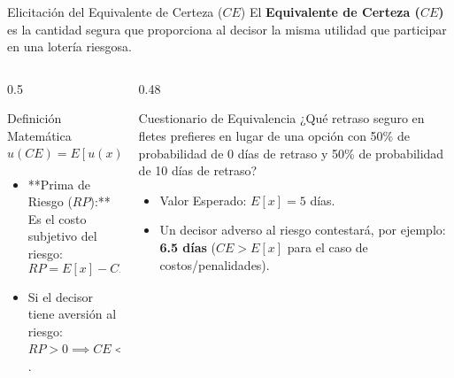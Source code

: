 \documentclass[aspectratio=169, 10pt]{beamer}
\begin{document}
\begin{frame}{Elicitación del Equivalente de Certeza ($CE$)}
    El \textbf{Equivalente de Certeza ($CE$)} es la cantidad segura que proporciona al decisor la misma utilidad que participar en una lotería riesgosa.
    \begin{columns}
        \begin{column}{0.5\textwidth}
            \begin{block}{Definición Matemática}
                \begin{equation*}
                    u(CE) = E[u(x)] = p \cdot u(x_{\text{mejor}}) + (1-p) \cdot u(x_{\text{peor}})
                \end{equation*}
                \begin{itemize}
                    \item **Prima de Riesgo ($RP$):** Es el costo subjetivo del riesgo:
                    \begin{equation*}
                        RP = E[x] - CE
                    \end{equation*}
                    \item Si el decisor tiene aversión al riesgo: $RP > 0 \implies CE < E[x]$.
                \end{itemize}
            \end{block}
        \end{column}
        
        \begin{column}{0.48\textwidth}
            \begin{exampleblock}{Cuestionario de Equivalencia}
                \scriptsize
                ¿Qué retraso seguro en fletes prefieres en lugar de una opción con 50\% de probabilidad de 0 días de retraso y 50\% de probabilidad de 10 días de retraso?
                \begin{itemize}
                    \item Valor Esperado: $E[x] = 5$ días.
                    \item Un decisor adverso al riesgo contestará, por ejemplo: \textbf{6.5 días} ($CE > E[x]$ para el caso de costos/penalidades).
                \end{itemize}
            \end{exampleblock}
        \end{column}
    \end{columns}
\end{frame}
\end{document}
